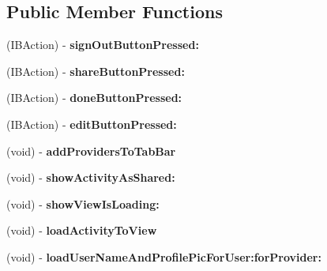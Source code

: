 \subsection*{Public Member Functions}
\begin{DoxyCompactItemize}
\item 
\hypertarget{interface_j_r_publish_activity_controller_aa39b7c116726bfa8e685e19db42129c7}{
(IBAction) -\/ {\bfseries signOutButtonPressed:}}
\label{interface_j_r_publish_activity_controller_aa39b7c116726bfa8e685e19db42129c7}

\item 
\hypertarget{interface_j_r_publish_activity_controller_a6ee409c815d64d0d6c90a0ff46130756}{
(IBAction) -\/ {\bfseries shareButtonPressed:}}
\label{interface_j_r_publish_activity_controller_a6ee409c815d64d0d6c90a0ff46130756}

\item 
\hypertarget{interface_j_r_publish_activity_controller_a326cfc27d4da2f3c42c23485d7355194}{
(IBAction) -\/ {\bfseries doneButtonPressed:}}
\label{interface_j_r_publish_activity_controller_a326cfc27d4da2f3c42c23485d7355194}

\item 
\hypertarget{interface_j_r_publish_activity_controller_aa8c0f59f31c6cb5f1939ba107b4b8184}{
(IBAction) -\/ {\bfseries editButtonPressed:}}
\label{interface_j_r_publish_activity_controller_aa8c0f59f31c6cb5f1939ba107b4b8184}

\item 
\hypertarget{interface_j_r_publish_activity_controller_a7d039a1d2991ac8a0a37eac1d362dceb}{
(void) -\/ {\bfseries addProvidersToTabBar}}
\label{interface_j_r_publish_activity_controller_a7d039a1d2991ac8a0a37eac1d362dceb}

\item 
\hypertarget{interface_j_r_publish_activity_controller_a3dc06a33ca3628f81b00cfe5a3594bc2}{
(void) -\/ {\bfseries showActivityAsShared:}}
\label{interface_j_r_publish_activity_controller_a3dc06a33ca3628f81b00cfe5a3594bc2}

\item 
\hypertarget{interface_j_r_publish_activity_controller_a36ed9b6bc2665e683dfb6e5f41e6ee2f}{
(void) -\/ {\bfseries showViewIsLoading:}}
\label{interface_j_r_publish_activity_controller_a36ed9b6bc2665e683dfb6e5f41e6ee2f}

\item 
\hypertarget{interface_j_r_publish_activity_controller_aa4ac37fa8f0a04e25fe4f34e71f3af90}{
(void) -\/ {\bfseries loadActivityToView}}
\label{interface_j_r_publish_activity_controller_aa4ac37fa8f0a04e25fe4f34e71f3af90}

\item 
\hypertarget{interface_j_r_publish_activity_controller_a5d9250fb2571b75481212fde814628da}{
(void) -\/ {\bfseries loadUserNameAndProfilePicForUser:forProvider:}}
\label{interface_j_r_publish_activity_controller_a5d9250fb2571b75481212fde814628da}

\end{DoxyCompactItemize}
